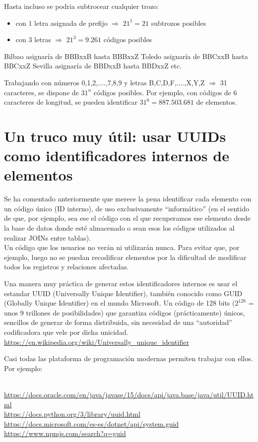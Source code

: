 \documentclass[spanish,12pt,a4paper,final,oneside]{book}
\begin{document}
Hasta incluso se podria subtrocear cualquier trozo:
\begin{itemize}
\item con 1 letra asignada de prefijo $\Rightarrow$ $21^1 = 21$ subtrozos posibles
\item con 3 letras $\Rightarrow$ $21^3 = 9.261$ códigos posibles
\end{itemize}
Bilbao asignaría de BBBxxB hasta BBBxxZ
Toledo asignaría de BBCxxB hasta BBCxxZ
Sevilla asignaría de BBDxxB hasta BBDxxZ
etc.  

\vspace{0.5cm}
Trabajando con números 0,1,2,....,7,8,9 y letras B,C,D,F,....,X,Y,Z $\Rightarrow$ 31 caracteres, se dispone de $31^n$ códigos posibles. Por ejemplo, con códigos de 6 caracteres de longitud, se pueden identificar $31^6 = 887.503.681$ de elementos.


\section{Un truco muy útil: usar UUIDs como identificadores internos de elementos}
Se ha comentado anteriormente que merece la pena identificar cada elemento con un código único (ID interno),  de uso exclusivamente  ``informático'' (en el sentido de que, por ejemplo, sea ese el código con el que recuperamos ese elemento desde la base de datos donde esté almacenado o sean esos los códigos utilizados al realizar JOINs entre tablas). 
\\Un código que los usuarios no verán ni utilizarán nunca. Para evitar que, por ejemplo, luego no se puedan recodificar elementos por la dificultad de modificar todos los registros y relaciones afectadas.

Una manera muy práctica de generar estos identificadores internos es usar el estandar UUID (Universally Unique Identifier), {\scriptsize también conocido como GUID (Globally Unique Identifier) en el mundo Microsoft}. Un código de 128 bits ($2^{128}$ = unos 9 trillones de posibilidades) que garantiza códigos (prácticamente) únicos, sencillos de generar de forma distribuida, sin necesidad de una ``autoridad'' codificadora que vele por dicha unicidad.
\\ \url{https://en.wikipedia.org/wiki/Universally_unique_identifier}

Casi todas las plataforma de programación modernas permiten trabajar con ellos. Por ejemplo:
\begin{scriptsize}
\\ \url{https://docs.oracle.com/en/java/javase/15/docs/api/java.base/java/util/UUID.html}
\\ \url{https://docs.python.org/3/library/uuid.html}
\\ \url{https://docs.microsoft.com/es-es/dotnet/api/system.guid}
\\ \url{https://www.npmjs.com/search?q=guid}
\end{scriptsize}
\end{document}
